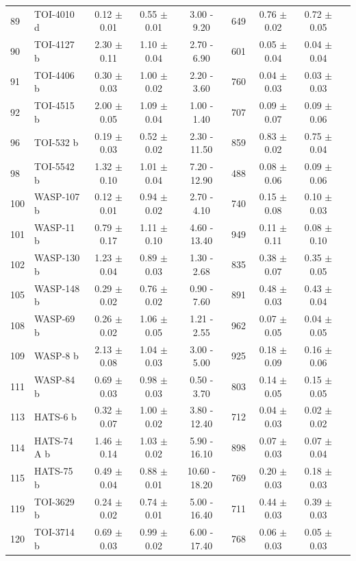 \begin{longtable}{llccccccc}
89 & TOI-4010 d & 0.12 $\pm$ 0.01 & 0.55 $\pm$ 0.01 & 3.00 - 9.20 & 649 & 0.76 $\pm$ 0.02 & 0.72 $\pm$ 0.05 \\
90 & TOI-4127 b & 2.30 $\pm$ 0.11 & 1.10 $\pm$ 0.04 & 2.70 - 6.90 & 601 & 0.05 $\pm$ 0.04 & 0.04 $\pm$ 0.04 \\
91 & TOI-4406 b & 0.30 $\pm$ 0.03 & 1.00 $\pm$ 0.02 & 2.20 - 3.60 & 760 & 0.04 $\pm$ 0.03 & 0.03 $\pm$ 0.03 \\
92 & TOI-4515 b & 2.00 $\pm$ 0.05 & 1.09 $\pm$ 0.04 & 1.00 - 1.40 & 707 & 0.09 $\pm$ 0.07 & 0.09 $\pm$ 0.06 \\
96 & TOI-532 b & 0.19 $\pm$ 0.03 & 0.52 $\pm$ 0.02 & 2.30 - 11.50 & 859 & 0.83 $\pm$ 0.02 & 0.75 $\pm$ 0.04 \\
98 & TOI-5542 b & 1.32 $\pm$ 0.10 & 1.01 $\pm$ 0.04 & 7.20 - 12.90 & 488 & 0.08 $\pm$ 0.06 & 0.09 $\pm$ 0.06 \\
100 & WASP-107 b & 0.12 $\pm$ 0.01 & 0.94 $\pm$ 0.02 & 2.70 - 4.10 & 740 & 0.15 $\pm$ 0.08 & 0.10 $\pm$ 0.03 \\
101 & WASP-11 b & 0.79 $\pm$ 0.17 & 1.11 $\pm$ 0.10 & 4.60 - 13.40 & 949 & 0.11 $\pm$ 0.11 & 0.08 $\pm$ 0.10 \\
102 & WASP-130 b & 1.23 $\pm$ 0.04 & 0.89 $\pm$ 0.03 & 1.30 - 2.68 & 835 & 0.38 $\pm$ 0.07 & 0.35 $\pm$ 0.05 \\
105 & WASP-148 b & 0.29 $\pm$ 0.02 & 0.76 $\pm$ 0.02 & 0.90 - 7.60 & 891 & 0.48 $\pm$ 0.03 & 0.43 $\pm$ 0.04 \\
108 & WASP-69 b & 0.26 $\pm$ 0.02 & 1.06 $\pm$ 0.05 & 1.21 - 2.55 & 962 & 0.07 $\pm$ 0.05 & 0.04 $\pm$ 0.05 \\
109 & WASP-8 b & 2.13 $\pm$ 0.08 & 1.04 $\pm$ 0.03 & 3.00 - 5.00 & 925 & 0.18 $\pm$ 0.09 & 0.16 $\pm$ 0.06 \\
111 & WASP-84 b & 0.69 $\pm$ 0.03 & 0.98 $\pm$ 0.03 & 0.50 - 3.70 & 803 & 0.14 $\pm$ 0.05 & 0.15 $\pm$ 0.05 \\
113 & HATS-6 b & 0.32 $\pm$ 0.07 & 1.00 $\pm$ 0.02 & 3.80 - 12.40 & 712 & 0.04 $\pm$ 0.03 & 0.02 $\pm$ 0.02 \\
114 & HATS-74 A b & 1.46 $\pm$ 0.14 & 1.03 $\pm$ 0.02 & 5.90 - 16.10 & 898 & 0.07 $\pm$ 0.03 & 0.07 $\pm$ 0.04 \\
115 & HATS-75 b & 0.49 $\pm$ 0.04 & 0.88 $\pm$ 0.01 & 10.60 - 18.20 & 769 & 0.20 $\pm$ 0.03 & 0.18 $\pm$ 0.03 \\
119 & TOI-3629 b & 0.24 $\pm$ 0.02 & 0.74 $\pm$ 0.01 & 5.00 - 16.40 & 711 & 0.44 $\pm$ 0.03 & 0.39 $\pm$ 0.03 \\
120 & TOI-3714 b & 0.69 $\pm$ 0.03 & 0.99 $\pm$ 0.02 & 6.00 - 17.40 & 768 & 0.06 $\pm$ 0.03 & 0.05 $\pm$ 0.03 \\

\end{longtable}
